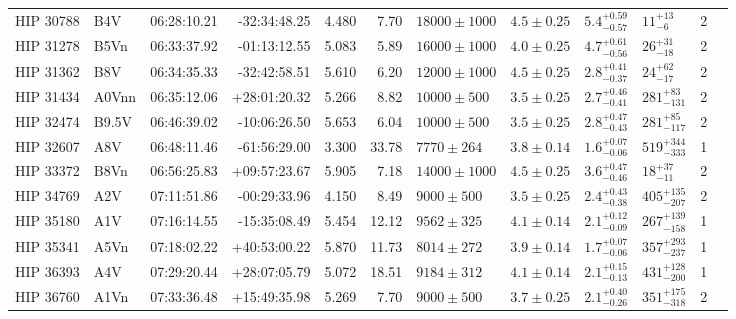 \begin{tiny}
\begin{longtable}{|l|lrrrrllllll|}
   HIP 30788 &      B4V &    06:28:10.21 &   -32:34:48.25 &   4.480 &      7.70 &  $18000 \pm 1000$ &  $4.5 \pm 0.25$ &  $5.4^{+0.59}_{-0.57}$ &       $11^{+13}_{-6}$ &       2 \\
   HIP 31278 &     B5Vn &    06:33:37.92 &   -01:13:12.55 &   5.083 &      5.89 &  $16000 \pm 1000$ &  $4.0 \pm 0.25$ &  $4.7^{+0.61}_{-0.56}$ &      $26^{+31}_{-18}$ &       2 \\
   HIP 31362 &      B8V &    06:34:35.33 &   -32:42:58.51 &   5.610 &      6.20 &  $12000 \pm 1000$ &  $4.5 \pm 0.25$ &  $2.8^{+0.41}_{-0.37}$ &      $24^{+62}_{-17}$ &       2 \\
   HIP 31434 &    A0Vnn &    06:35:12.06 &   +28:01:20.32 &   5.266 &      8.82 &   $10000 \pm 500$ &  $3.5 \pm 0.25$ &  $2.7^{+0.46}_{-0.41}$ &    $281^{+83}_{-131}$ &       2 \\
   HIP 32474 &    B9.5V &    06:46:39.02 &   -10:06:26.50 &   5.653 &      6.04 &   $10000 \pm 500$ &  $3.5 \pm 0.25$ &  $2.8^{+0.47}_{-0.43}$ &    $281^{+85}_{-117}$ &       2 \\
   HIP 32607 &      A8V &    06:48:11.46 &   -61:56:29.00 &   3.300 &     33.78 &    $7770 \pm 264$ &  $3.8 \pm 0.14$ &  $1.6^{+0.07}_{-0.06}$ &   $519^{+344}_{-333}$ &       1 \\
   HIP 33372 &     B8Vn &    06:56:25.83 &   +09:57:23.67 &   5.905 &      7.18 &  $14000 \pm 1000$ &  $4.5 \pm 0.25$ &  $3.6^{+0.47}_{-0.46}$ &      $18^{+37}_{-11}$ &       2 \\
   HIP 34769 &      A2V &    07:11:51.86 &   -00:29:33.96 &   4.150 &      8.49 &    $9000 \pm 500$ &  $3.5 \pm 0.25$ &  $2.4^{+0.43}_{-0.38}$ &   $405^{+135}_{-207}$ &       2 \\
   HIP 35180 &      A1V &    07:16:14.55 &   -15:35:08.49 &   5.454 &     12.12 &    $9562 \pm 325$ &  $4.1 \pm 0.14$ &  $2.1^{+0.12}_{-0.09}$ &   $267^{+139}_{-158}$ &       1 \\
   HIP 35341 &     A5Vn &    07:18:02.22 &   +40:53:00.22 &   5.870 &     11.73 &    $8014 \pm 272$ &  $3.9 \pm 0.14$ &  $1.7^{+0.07}_{-0.06}$ &   $357^{+293}_{-237}$ &       1 \\
   HIP 36393 &      A4V &    07:29:20.44 &   +28:07:05.79 &   5.072 &     18.51 &    $9184 \pm 312$ &  $4.1 \pm 0.14$ &  $2.1^{+0.15}_{-0.13}$ &   $431^{+128}_{-200}$ &       1 \\
   HIP 36760 &     A1Vn &    07:33:36.48 &   +15:49:35.98 &   5.269 &      7.70 &    $9000 \pm 500$ &  $3.7 \pm 0.25$ &  $2.1^{+0.40}_{-0.26}$ &   $351^{+175}_{-318}$ &       2 \\

\end{longtable}
\end{tiny}
